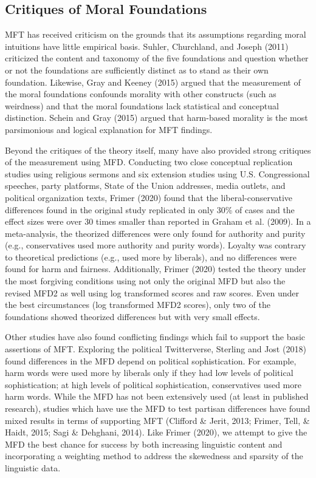 \documentclass[
  man,floatsintext]{apa6}
\begin{document}
\subsection{Critiques of Moral Foundations}\label{critiques-of-moral-foundations}

MFT has received criticism on the grounds that its assumptions regarding
moral intuitions have little empirical basis. Suhler, Churchland, and Joseph (2011) criticized the
content and taxonomy of the five foundations and question whether or not
the foundations are sufficiently distinct as to stand as their own
foundation. Likewise, Gray and Keeney (2015) argued that the measurement of the moral
foundations confounds morality with other constructs (such as weirdness)
and that the moral foundations lack statistical and conceptual distinction.
Schein and Gray (2015) argued that harm-based morality is the most parsimonious and
logical explanation for MFT findings.

Beyond the critiques of the theory itself, many have also provided
strong critiques of the measurement using MFD. Conducting two close
conceptual replication studies using religious sermons and six extension
studies using U.S. Congressional speeches, party platforms, State of the
Union addresses, media outlets, and political organization texts,
Frimer (2020) found that the liberal-conservative differences found in the
original study replicated in only 30\% of cases and the effect sizes were
over 30 times smaller than reported in Graham et al. (2009). In a meta-analysis,
the theorized differences were only found for authority and purity
(e.g., conservatives used more authority and purity words). Loyalty was
contrary to theoretical predictions (e.g., used more by liberals), and
no differences were found for harm and fairness. Additionally,
Frimer (2020) tested the theory under the most forgiving conditions using
not only the original MFD but also the revised MFD2 as well using log
transformed scores and raw scores. Even under the best circumstances
(log transformed MFD2 scores), only two of the foundations showed
theorized differences but with very small effects.

Other studies have
also found conflicting findings which fail to support the basic
assertions of MFT. Exploring the political Twitterverse, Sterling and Jost (2018)
found differences in the MFD depend on political sophistication. For
example, harm words were used more by liberals only if they had low
levels of political sophistication; at high levels of political
sophistication, conservatives used more harm words. While the MFD has
not been extensively used (at least in published research), studies
which have use the MFD to test partisan differences have found mixed
results in terms of supporting MFT (Clifford \& Jerit, 2013; Frimer, Tell, \& Haidt, 2015; Sagi \& Dehghani, 2014). Like Frimer (2020), we attempt to give the MFD the best chance
for success by both increasing linguistic content and incorporating a weighting method to address the
skewedness and sparsity of the linguistic data.
\end{document}
